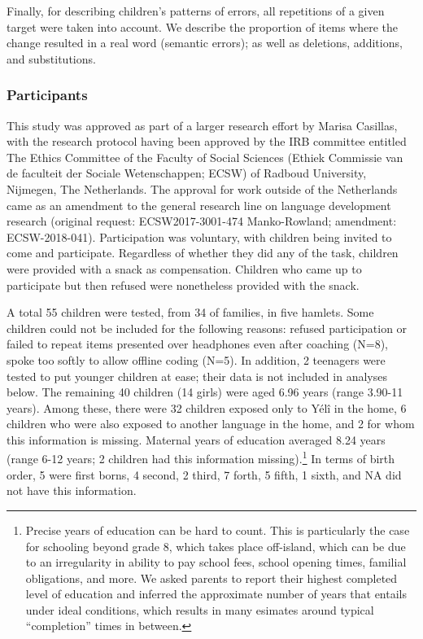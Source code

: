\documentclass[english,,man,floatsintext]{apa6}
\begin{document}
Finally, for describing children's patterns of errors, all repetitions
of a given target were taken into account. We describe the proportion of
items where the change resulted in a real word (semantic errors); as
well as deletions, additions, and substitutions.

\subsubsection{Participants}\label{participants}

This study was approved as part of a larger research effort by Marisa
Casillas, with the research protocol having been approved by the IRB
committee entitled The Ethics Committee of the Faculty of Social
Sciences (Ethiek Commissie van de faculteit der Sociale Wetenschappen;
ECSW) of Radboud University, Nijmegen, The Netherlands. The approval for
work outside of the Netherlands came as an amendment to the general
research line on language development research (original request:
ECSW2017-3001-474 Manko-Rowland; amendment: ECSW-2018-041).
Participation was voluntary, with children being invited to come and
participate. Regardless of whether they did any of the task, children
were provided with a snack as compensation. Children who came up to
participate but then refused were nonetheless provided with the snack.

A total 55 children were tested, from 34 of families, in five hamlets.
Some children could not be included for the following reasons: refused
participation or failed to repeat items presented over headphones even
after coaching (N=8), spoke too softly to allow offline coding (N=5). In
addition, 2 teenagers were tested to put younger children at ease; their
data is not included in analyses below. The remaining 40 children (14
girls) were aged 6.96 years (range 3.90-11 years). Among these, there
were 32 children exposed only to Yélî in the home, 6 children who were
also exposed to another language in the home, and 2 for whom this
information is missing. Maternal years of education averaged 8.24 years
(range 6-12 years; 2 children had this information missing).\footnote{Precise
  years of education can be hard to count. This is particularly the case
  for schooling beyond grade 8, which takes place off-island, which can
  be due to an irregularity in ability to pay school fees, school
  opening times, familial obligations, and more. We asked parents to
  report their highest completed level of education and inferred the
  approximate number of years that entails under ideal conditions, which
  results in many esimates around typical ``completion'' times in
  between.} In terms of birth order, 5 were first borns, 4 second, 2
third, 7 forth, 5 fifth, 1 sixth, and NA did not have this information.
\end{document}
